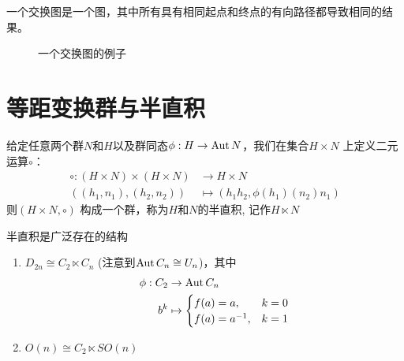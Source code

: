 \begin{definition}
    一个交换图是一个图，其中所有具有相同起点和终点的有向路径都导致相同的结果。
    \begin{figure}[H]
        \centering
        \caption{一个交换图的例子}
    \end{figure}
\end{definition}

\section{等距变换群与半直积}

\begin{definition}
    给定任意两个群\(N\)和\(H\)以及群同态\(\phi: H \to \operatorname{\mathrm{Aut}}{N}\)，我们在集合\(H
    \times N\) 上定义二元运算\(\circ\)：
    \begin{align*}
        \circ : (H\times N)\times (H\times N) & \to H\times N \\
        ((h_{1}, n_{1}), (h_{2}, n_{2})) & \mapsto
        (h_{1}h_{2}, \phi(h_{1})(n_{2})n_{1})
    \end{align*}
    则\((H\times N, \circ )\) 构成一个群，称为\(H\)和\(N\)的半直积,
    记作\(H\ltimes N\)
\end{definition}

半直积是广泛存在的结构
\begin{enumerate}
    \item \(D_{2n}\cong C_{2}\ltimes C_{n}\) (注意到\(\operatorname{\mathrm{Aut}}
        C_{n}\cong U_{n}\))，其中
        \begin{align*}
            \phi: C_{2} & \to \operatorname{\mathrm{Aut}}{C_{n}} \\
            b^{k} & \mapsto
            \begin{cases}
                f(a)  = a, & k=0 \\
                f(a)  = a^{-1}, &k=1
            \end{cases}
        \end{align*}
    \item \(O(n)\cong C_{2} \ltimes SO(n)\)
\end{enumerate}

